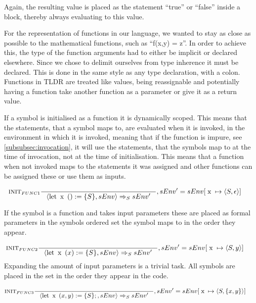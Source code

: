 Again, the resulting value is placed as the statement \enquote{true} or \enquote{false} inside a block, thereby always evaluating to this value.

For the representation of functions in our language, we wanted to stay as close as possible to the mathematical functions, such as \enquote{f(x,y) = z}. In order to achieve this, the type of the function arguments had to either be implicit or declared elsewhere. Since we chose to delimit ourselves from type inherence it must be declared. This is done in the same style as any type declaration, with a colon. Functions in TLDR are treated like values, being reassignable and potentially having a function take another function as a parameter or give it as a return value.

If a symbol is initialised as a function it is dynamically scoped. This means that the statements, that a symbol maps to, are evaluated when it is invoked, in the environment in which it is invoked, meaning that if the function is impure, see \cref{subsubsec:invocation}, it will use the statements, that the symbols map to at the time of invocation, not at the time of initialisation. This means that a function when not invoked maps to the statements it was assigned and other functions can be assigned these or use them as inputs.

\begin{align*}
&\inference[$\text{INIT}_{FUNC1}$]{}
                         {\Braket{\Tlet \Tx() := \{S\},sEnv} \Rightarrow_S sEnv'}
												 {, sEnv' = sEnv[\Tx \mapsto \Braket{S,\epsilon}]}
\end{align*}

If the symbol is a function and takes input parameters these are placed as formal parameters in the symbols ordered set the symbol maps to in the order they appear.

\begin{align*}
&\inference[$\text{INIT}_{FUNC2}$]{}
                         {\Braket{\Tlet \Tx(x) := \{S\},sEnv} \Rightarrow_S sEnv'}
												 {, sEnv' = sEnv[\Tx \mapsto \Braket{S,y}]}
\end{align*}
Expanding the amount of input parameters is a trivial task. All symbols are placed in the set in the order they appear in the code. 

\begin{align*}
&\inference[$\text{INIT}_{FUNC3}$]{}
                         {\Braket{\Tlet \Tx(x,y) := \{S\};,sEnv} \Rightarrow_S sEnv'}
												 {, sEnv' = sEnv[\Tx \mapsto \Braket{S,\{x,y\}}]}
\end{align*}

